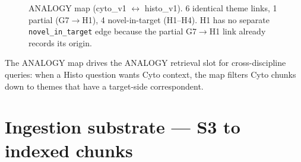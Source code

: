 \documentclass[10pt,letterpaper]{article}
\begin{document}
\begin{figure}[H]
\caption{ANALOGY map (cyto\_v1 $\leftrightarrow$ histo\_v1). 6 identical theme links, 1 partial (G7$\rightarrow$H1), 4 novel-in-target (H1--H4). H1 has no separate \texttt{novel\_in\_target} edge because the partial G7$\rightarrow$H1 link already records its origin.}
\end{figure}

The ANALOGY map drives the ANALOGY retrieval slot for cross-discipline queries: when a Histo question wants Cyto context, the map filters Cyto chunks down to themes that have a target-side correspondent.

\section{Ingestion substrate --- S3 to indexed chunks}
\end{document}
